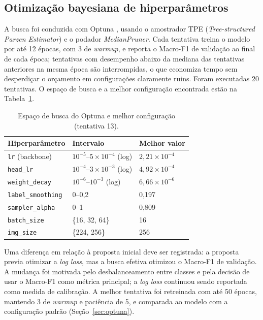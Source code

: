 \documentclass[11pt,a4paper]{article}
\begin{document}
	\subsection{Otimização bayesiana de hiperparâmetros}
	
	A busca foi conduzida com Optuna \cite{akiba2019}, usando o amostrador TPE (\emph{Tree-structured Parzen Estimator}) e o podador \emph{MedianPruner}. Cada tentativa treina o modelo por até 12 épocas, com 3 de \emph{warmup}, e reporta o Macro-F1 de validação ao final de cada época; tentativas com desempenho abaixo da mediana das tentativas anteriores na mesma época são interrompidas, o que economiza tempo sem desperdiçar o orçamento em configurações claramente ruins. Foram executadas 20 tentativas. O espaço de busca e a melhor configuração encontrada estão na Tabela~\ref{tab:optuna-espaco}.
	
	\begin{table}[htbp]
		\centering
		\small
		\caption{Espaço de busca do Optuna e melhor configuração (tentativa 13).}
		\label{tab:optuna-espaco}
		\begin{tabular}{lll}
			\toprule
			\textbf{Hiperparâmetro} & \textbf{Intervalo} & \textbf{Melhor valor} \\
			\midrule
			\texttt{lr} (backbone) & $10^{-5}$--$5\times10^{-4}$ (log) & $2{,}21 \times 10^{-4}$ \\
			\texttt{head\_lr} & $10^{-4}$--$3\times10^{-3}$ (log) & $4{,}92 \times 10^{-4}$ \\
			\texttt{weight\_decay} & $10^{-6}$--$10^{-3}$ (log) & $6{,}66 \times 10^{-6}$ \\
			\texttt{label\_smoothing} & 0--0,2 & 0,197 \\
			\texttt{sampler\_alpha} & 0--1 & 0,809 \\
			\texttt{batch\_size} & \{16, 32, 64\} & 16 \\
			\texttt{img\_size} & \{224, 256\} & 256 \\
			\bottomrule
		\end{tabular}
	\end{table}
	
	Uma diferença em relação à proposta inicial deve ser registrada: a proposta previa otimizar a \emph{log loss}, mas a busca efetiva otimizou o Macro-F1 de validação. A mudança foi motivada pelo desbalanceamento entre classes e pela decisão de usar o Macro-F1 como métrica principal; a \emph{log loss} continuou sendo reportada como medida de calibração. A melhor tentativa foi retreinada com até 50 épocas, mantendo 3 de \emph{warmup} e paciência de 5, e comparada ao modelo com a configuração padrão (Seção~\ref{sec:optuna}).
	
\end{document}
